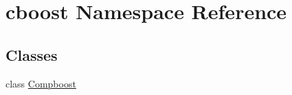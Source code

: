 \hypertarget{namespacecboost}{}\section{cboost Namespace Reference}
\label{namespacecboost}
\subsection*{Classes}
\begin{DoxyCompactItemize}
\item 
class \hyperlink{classcboost_1_1_compboost}{Compboost}
\end{DoxyCompactItemize}
